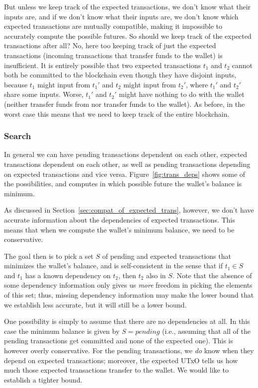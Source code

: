 \documentclass{article}
\begin{document}
But unless we keep track of the expected transactions, we don't know what their
inputs are, and if we don't know what their inputs are, we don't know which
expected transactions are mutually compatible, making it impossible to
accurately compute the possible futures. So should we keep track of the expected
transactions after all? No, here too keeping track of just the expected
transactions (incoming transactions that transfer funds to the wallet) is
insufficient. It is entirely possible that two expected transactions $t_1$ and
$t_2$ cannot both be committed to the blockchain even though they have disjoint
inputs, because $t_1$ might input from $t_1'$ and $t_2$ might input from $t_2'$,
where $t_1'$ and $t_2'$ share some inputs. Worse, $t_1'$ and $t_2'$ might have
nothing to do with the wallet (neither transfer funds from nor transfer funds to
the wallet). As before, in the worst case this means that we need to keep
track of the entire blockchain.

\subsubsection{Search}

In general we can have pending transactions dependent on each other, expected
transactions dependent on each other, as well as pending transactions depending
on expected transactions and vice versa. Figure~\ref{fig:trans_deps} shows
some of the possibilities, and computes in which possible future the wallet's
balance is minimum.

As discussed in Section~\ref{sec:compat_of_expected_trans}, however, we don't
have accurate information about the dependencies of expected transactions. This
means that when we compute the wallet's minimum balance, we need to be
conservative.

The goal then is to pick a set $S$ of pending and expected transactions that
minimizes the wallet's balance, and is self-consistent in the sense that
if $t_1 \in S$ and $t_1$ has a known dependency on $t_2$, then $t_2$ also in
$S$. Note that the absence of some dependency information only gives us
\emph{more} freedom in picking the elements of this set; thus, missing
dependency information may make the lower bound that we establish less accurate,
but it will still be a lower bound.

One possibility is simply to assume that there are no dependencies at all. In
this case the minimum balance is given by $S = \mathit{pending}$ (i.e., assuming
that all of the pending transactions get committed and none of the  expected
one). This is however overly conservative. For the pending transactions, we
\emph{do} know when they depend on expected transactions; moreover, the expected
UTxO tells us how much those expected transactions transfer to the wallet. We
would like to establish a tighter bound.
\end{document}
